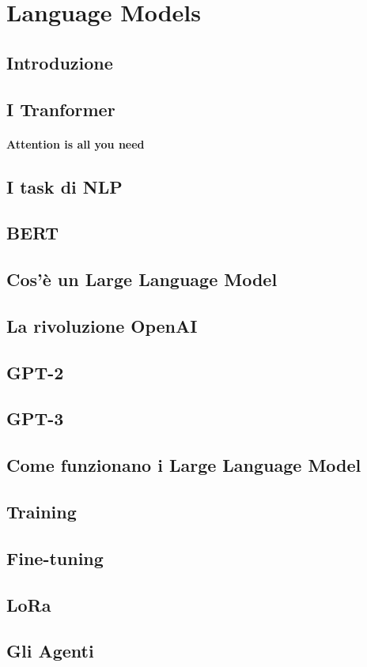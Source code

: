 \chapter{Language Models}\label{Language_Models}
\section{Introduzione}
\section{I Tranformer}
\subsubsection[Attention is all you need]{Attention is all you need}
\section{I task di NLP}
\section{BERT}
\section{Cos'è un Large Language Model}
\section{La rivoluzione OpenAI}
\section{GPT-2}
\section{GPT-3}
\section{Come funzionano i Large Language Model}
\section{Training}
\section{Fine-tuning}
\section{LoRa}
\section{Gli Agenti}